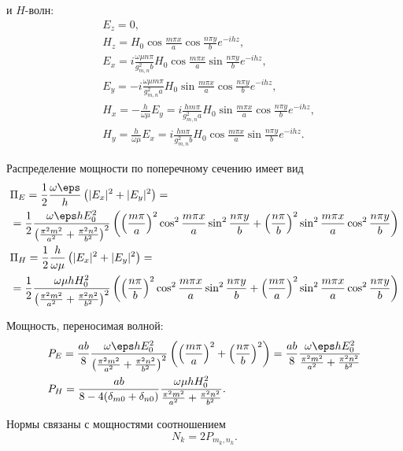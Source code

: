 \documentclass[a4paper,14pt]{extarticle}
\begin{document}
	и \( H \)-волн:
	\begin{align*}
		& E_z = 0,\\
		& H_z = H_0\cos\frac{m\pi x}{a}\cos\frac{n\pi y}{b}e^{-ihz},\\
		& E_x = i\frac{\omega\mu n\pi}{g_{m,n}^2b}H_0\cos\frac{m\pi x}{a}\sin\frac{n\pi y}{b}e^{-ihz},\\
		& E_y = -i\frac{\omega\mu m\pi}{g_{m,n}^2a}H_0\sin\frac{m\pi x}{a}\cos\frac{n\pi y}{b}e^{-ihz},\\
		& H_x = -\frac{h}{\omega\mu}E_y = i\frac{hm\pi}{g_{m,n}^2a}H_0\sin\frac{m\pi x}{a}\cos\frac{n\pi y}{b}e^{-ihz},\\
		& H_y = \frac{h}{\omega\mu}E_x = i\frac{h n\pi}{g_{m,n}^2b}H_0\cos\frac{m\pi x}{a}\sin\frac{n\pi y}{b}e^{-ihz}.
	\end{align*}

	Распределение мощности по поперечному сечению имеет вид
	\begin{align*}
		& \Pi_E = \frac{1}{2}\frac{\omega\eps}{h}\left(|E_x|^2 + |E_y|^2\right) = \\
		& = \frac{1}{2}\frac{\omega\eps h E_0^2}{\left(\frac{\pi^2m^2}{a^2} + \frac{\pi^2n^2}{b^2}\right)^2}\left( \left(\frac{m\pi}{a}\right)^2\cos^2\frac{m\pi x}{a}\sin^2\frac{n\pi y}{b} + \left(\frac{n\pi}{b}\right)^2\sin^2\frac{m\pi x}{a}\cos^2\frac{n\pi y}{b} \right) \\
		& \Pi_H = \frac{1}{2}\frac{h}{\omega\mu}\left(|E_x|^2 + |E_y|^2\right) = \\
		& = \frac{1}{2}\frac{\omega\mu h H_0^2}{\left(\frac{\pi^2m^2}{a^2} + \frac{\pi^2n^2}{b^2}\right)^2}\left( \left(\frac{n\pi}{b}\right)^2\cos^2\frac{m\pi x}{a}\sin^2\frac{n\pi y}{b} + \left(\frac{m\pi}{a}\right)^2\sin^2\frac{m\pi x}{a}\cos^2\frac{n\pi y}{b} \right)
	\end{align*}

	Мощность, переносимая волной:
	\begin{align*}
		& P_E = \frac{ab}{8}\frac{\omega\eps h E_0^2}{\left(\frac{\pi^2m^2}{a^2} + \frac{\pi^2n^2}{b^2}\right)^2}\left( \left(\frac{m\pi}{a}\right)^2 + \left(\frac{n\pi}{b}\right)^2 \right) = \frac{ab}{8}\frac{\omega\eps h E_0^2}{\frac{\pi^2m^2}{a^2} + \frac{\pi^2n^2}{b^2}} \\
		& P_H =
			\frac{ab}{8-4(\delta_{m0}+\delta_{n0})}\frac{\omega\mu h H_0^2}{\frac{\pi^2m^2}{a^2} + \frac{\pi^2n^2}{b^2}}.
	\end{align*}

	Нормы связаны с мощностями соотношением
	\[
		N_k = 2P_{m_k,n_k}.
	\]
\end{document}
